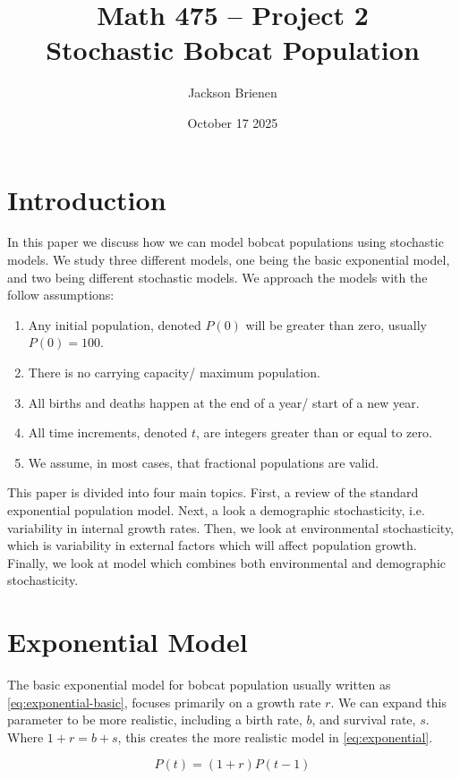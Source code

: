 \documentclass{article}
\title{Math 475 -- Project 2 \\ Stochastic Bobcat Population}
\author{Jackson Brienen}
\date{October 17 2025}
\begin{document}
\maketitle

\section{Introduction}

In this paper we discuss how we can model bobcat populations using stochastic models. We study three different models, one being the basic exponential model, and two being different stochastic models. We approach the models with the follow assumptions:

\begin{enumerate}
    \item Any initial population, denoted $P(0)$ will be greater than zero, usually $P(0)=100$.
    \item There is no carrying capacity/ maximum population.
    \item All births and deaths happen at the end of a year/ start of a new year.
    \item All time increments, denoted $t$, are integers greater than or equal to zero.
    \item We assume, in most cases, that fractional populations are valid.
\end{enumerate}

This paper is divided into four main topics. First, a review of the standard exponential population model. Next, a look a demographic stochasticity, i.e. variability in internal growth rates. Then, we look at environmental stochasticity, which is variability in external factors which will affect population growth. Finally, we look at model which combines both environmental and demographic stochasticity.

\section{Exponential Model}

The basic exponential model for bobcat population usually written as \cref{eq:exponential-basic}, focuses primarily on a growth rate $r$. We can expand this parameter to be more realistic, including a birth rate, $b$, and survival rate, $s$. Where $1 + r = b + s$, this creates the more realistic model in \cref{eq:exponential}.

\begin{equation} \label{eq:exponential-basic}
    P(t) = (1 + r)P(t-1)
\end{equation}
\end{document}
